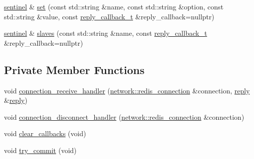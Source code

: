 \begin{DoxyCompactItemize}
\item 
\hyperlink{classcpp__redis_1_1sentinel}{sentinel} \& \hyperlink{classcpp__redis_1_1sentinel_a1579c9c9b8ac3cded0a7d70e709e5e1b}{set} (const std\+::string \&name, const std\+::string \&option, const std\+::string \&value, const \hyperlink{classcpp__redis_1_1sentinel_ae1a150ff8787208c47414397a061c9a7}{reply\+\_\+callback\+\_\+t} \&reply\+\_\+callback=nullptr)
\item 
\hyperlink{classcpp__redis_1_1sentinel}{sentinel} \& \hyperlink{classcpp__redis_1_1sentinel_aa4b19659807388d276764f9a79132d00}{slaves} (const std\+::string \&name, const \hyperlink{classcpp__redis_1_1sentinel_ae1a150ff8787208c47414397a061c9a7}{reply\+\_\+callback\+\_\+t} \&reply\+\_\+callback=nullptr)
\end{DoxyCompactItemize}
\subsection*{Private Member Functions}
\begin{DoxyCompactItemize}
\item 
void \hyperlink{classcpp__redis_1_1sentinel_af18d66cd6f5fc4408800fe16201cf9c8}{connection\+\_\+receive\+\_\+handler} (\hyperlink{classcpp__redis_1_1network_1_1redis__connection}{network\+::redis\+\_\+connection} \&connection, \hyperlink{classcpp__redis_1_1reply}{reply} \&\hyperlink{classcpp__redis_1_1reply}{reply})
\item 
void \hyperlink{classcpp__redis_1_1sentinel_a2b082c15a48316ae5e8b3ab301796e37}{connection\+\_\+disconnect\+\_\+handler} (\hyperlink{classcpp__redis_1_1network_1_1redis__connection}{network\+::redis\+\_\+connection} \&connection)
\item 
void \hyperlink{classcpp__redis_1_1sentinel_a4f5364cf618fefe34ced591d698f5caf}{clear\+\_\+callbacks} (void)
\item 
void \hyperlink{classcpp__redis_1_1sentinel_ad27b6a3558e6d3a634df11dca80154df}{try\+\_\+commit} (void)
\end{DoxyCompactItemize}
